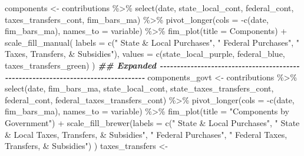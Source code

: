 \documentclass[
]{article}
\newenvironment{Shaded}{\begin{snugshade}}{\end{snugshade}}
\newcommand{\AttributeTok}[1]{\textcolor[rgb]{0.77,0.63,0.00}{#1}}
\newcommand{\DocumentationTok}[1]{\textcolor[rgb]{0.56,0.35,0.01}{\textbf{\textit{#1}}}}
\newcommand{\FunctionTok}[1]{\textcolor[rgb]{0.00,0.00,0.00}{#1}}
\newcommand{\NormalTok}[1]{#1}
\newcommand{\OtherTok}[1]{\textcolor[rgb]{0.56,0.35,0.01}{#1}}
\newcommand{\SpecialCharTok}[1]{\textcolor[rgb]{0.00,0.00,0.00}{#1}}
\newcommand{\StringTok}[1]{\textcolor[rgb]{0.31,0.60,0.02}{#1}}
\begin{document}
\begin{Shaded}
\begin{Highlighting}[]
\NormalTok{components }\OtherTok{\textless{}{-}}
\NormalTok{  contributions }\SpecialCharTok{\%\textgreater{}\%}
  \FunctionTok{select}\NormalTok{(date, state\_local\_cont, federal\_cont, taxes\_transfers\_cont, fim\_bars\_ma) }\SpecialCharTok{\%\textgreater{}\%}
  \FunctionTok{pivot\_longer}\NormalTok{(}\AttributeTok{cols =} \SpecialCharTok{{-}}\FunctionTok{c}\NormalTok{(date, fim\_bars\_ma), }\AttributeTok{names\_to =} \StringTok{\textquotesingle{}variable\textquotesingle{}}\NormalTok{) }\SpecialCharTok{\%\textgreater{}\%}
  \FunctionTok{fim\_plot}\NormalTok{(}\AttributeTok{title =} \StringTok{\textquotesingle{}Components\textquotesingle{}}\NormalTok{) }\SpecialCharTok{+}
  \FunctionTok{scale\_fill\_manual}\NormalTok{(}
    \AttributeTok{labels =} \FunctionTok{c}\NormalTok{(}\StringTok{" State \& Local Purchases"}\NormalTok{, }\StringTok{" Federal Purchases"}\NormalTok{, }\StringTok{" Taxes, Transfers, \& Subsidies"}\NormalTok{),}
                \AttributeTok{values =}  \FunctionTok{c}\NormalTok{(state\_local\_purple, federal\_blue, taxes\_transfers\_green)}
\NormalTok{    )}
\DocumentationTok{\#\# Expanded {-}{-}{-}{-}{-}{-}{-}{-}{-}{-}{-}{-}{-}{-}{-}{-}{-}{-}{-}{-}{-}{-}{-}{-}{-}{-}{-}{-}{-}{-}{-}{-}{-}{-}{-}{-}{-}{-}{-}{-}{-}{-}{-}{-}{-}{-}{-}{-}{-}{-}{-}{-}{-}{-}{-}{-}{-}{-}{-}{-}{-}{-}{-}{-}{-}{-}{-}{-}{-}{-}{-}{-}{-}{-}{-}{-}{-}{-}{-}{-}{-}{-}}
\NormalTok{components\_govt }\OtherTok{\textless{}{-}}
\NormalTok{  contributions }\SpecialCharTok{\%\textgreater{}\%}
    \FunctionTok{select}\NormalTok{(date, fim\_bars\_ma, state\_local\_cont, state\_taxes\_transfers\_cont, }
\NormalTok{           federal\_cont, federal\_taxes\_transfers\_cont) }\SpecialCharTok{\%\textgreater{}\%}
  \FunctionTok{pivot\_longer}\NormalTok{(}\AttributeTok{cols =} \SpecialCharTok{{-}}\FunctionTok{c}\NormalTok{(date, fim\_bars\_ma), }\AttributeTok{names\_to =} \StringTok{\textquotesingle{}variable\textquotesingle{}}\NormalTok{) }\SpecialCharTok{\%\textgreater{}\%}
  \FunctionTok{fim\_plot}\NormalTok{(}\AttributeTok{title =} \StringTok{"Components by Government"}\NormalTok{) }\SpecialCharTok{+}
  \FunctionTok{scale\_fill\_brewer}\NormalTok{(}\AttributeTok{labels =} \FunctionTok{c}\NormalTok{(}\StringTok{" State \& Local Purchases"}\NormalTok{,}
                               \StringTok{" State \& Local Taxes, Transfers, \& Subsidies"}\NormalTok{,}
                                \StringTok{" Federal Purchases"}\NormalTok{,}
                               \StringTok{" Federal Taxes, Transfers, \& Subsidies"}\NormalTok{)}
\NormalTok{                    )}
\NormalTok{taxes\_transfers }\OtherTok{\textless{}{-}}

\end{Highlighting}
\end{Shaded}
\end{document}
